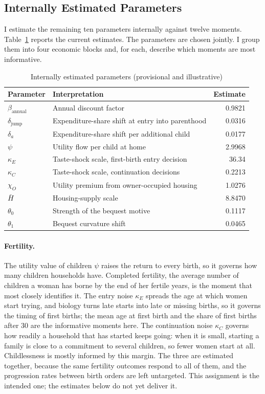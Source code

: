 \documentclass[11pt]{article}
\begin{document}
\subsection{Internally Estimated Parameters}

I estimate the remaining ten parameters internally against twelve moments.
Table~\ref{tab:quant_parameters} reports the current estimates. The parameters
are chosen jointly. I group them into four economic blocks and, for each,
describe which moments are most informative.

\begin{table}[H]
\centering
\caption{Internally estimated parameters (provisional and illustrative)}
\label{tab:quant_parameters}
\small
\begin{tabularx}{0.9\textwidth}{@{}l X r@{}}
\toprule
Parameter & Interpretation & Estimate \\
\midrule
$\beta_{\mathrm{annual}}$ & Annual discount factor & 0.9821 \\
$\delta_{\mathrm{jump}}$ & Expenditure-share shift at entry into parenthood & 0.0316 \\
$\delta_a$ & Expenditure-share shift per additional child & 0.0177 \\
$\psi$ & Utility flow per child at home & 2.9968 \\
$\kappa_E$ & Taste-shock scale, first-birth entry decision & 36.34 \\
$\kappa_C$ & Taste-shock scale, continuation decisions & 0.2213 \\
$\chi_O$ & Utility premium from owner-occupied housing & 1.0276 \\
$\bar H$ & Housing-supply scale & 8.8470 \\
$\theta_0$ & Strength of the bequest motive & 0.1117 \\
$\theta_1$ & Bequest curvature shift & 0.0465 \\
\bottomrule
\end{tabularx}
\end{table}

\paragraph{Fertility.}
The utility value of children $\psi$ raises the return to every birth, so it
governs how many children households have. Completed fertility, the average
number of children a woman has borne by the end of her fertile years, is the
moment that most closely identifies it. The entry noise $\kappa_E$ spreads
the age at which women start trying, and biology turns late starts into late
or missing births, so it governs the timing of first births; the mean age at
first birth and the share of first births after 30 are the informative
moments here. The continuation noise $\kappa_C$ governs how readily a
household that has started keeps going: when it is small, starting a family
is close to a commitment to several children, so fewer women start at all.
Childlessness is mostly informed by this margin. The three are estimated
together, because the same
fertility outcomes respond to all of them, and the progression rates between
birth orders are left untargeted. This assignment is the intended one; the
estimates below do not yet deliver it.
\end{document}

